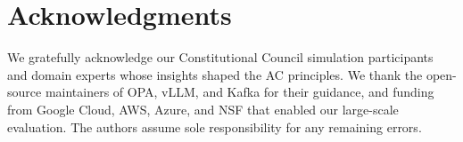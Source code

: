















\section*{Acknowledgments}
We gratefully acknowledge our Constitutional Council simulation participants and domain experts whose insights shaped the AC principles. We thank the open-source maintainers of OPA, vLLM, and Kafka for their guidance, and funding from Google Cloud, AWS, Azure, and NSF that enabled our large-scale evaluation. The authors assume sole responsibility for any remaining errors.

{\small
\raggedright


}




